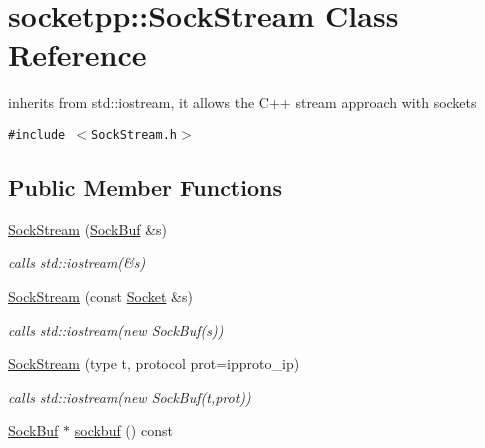 \hypertarget{classsocketpp_1_1SockStream}{
\section{socketpp::SockStream Class Reference}
\label{classsocketpp_1_1SockStream}
}
inherits from std::iostream, it allows the C++ stream approach with sockets  


{\tt \#include $<$SockStream.h$>$}

\subsection*{Public Member Functions}
\begin{CompactItemize}
\item 
\hypertarget{classsocketpp_1_1SockStream_11fbfc7bda45c178c6e09ac6d67512fd}{
\hyperlink{classsocketpp_1_1SockStream_11fbfc7bda45c178c6e09ac6d67512fd}{SockStream} (\hyperlink{classsocketpp_1_1SockBuf}{SockBuf} \&s)}
\label{classsocketpp_1_1SockStream_11fbfc7bda45c178c6e09ac6d67512fd}

\begin{CompactList}\small\item\em calls std::iostream(\&s) \item\end{CompactList}\item 
\hypertarget{classsocketpp_1_1SockStream_704f4e77af424bd0638e736653e2d1b3}{
\hyperlink{classsocketpp_1_1SockStream_704f4e77af424bd0638e736653e2d1b3}{SockStream} (const \hyperlink{classsocketpp_1_1Socket}{Socket} \&s)}
\label{classsocketpp_1_1SockStream_704f4e77af424bd0638e736653e2d1b3}

\begin{CompactList}\small\item\em calls std::iostream(new SockBuf(s)) \item\end{CompactList}\item 
\hypertarget{classsocketpp_1_1SockStream_4baa8d20dd73480832c7dd9cbad15f75}{
\hyperlink{classsocketpp_1_1SockStream_4baa8d20dd73480832c7dd9cbad15f75}{SockStream} (type t, protocol prot=ipproto\_\-ip)}
\label{classsocketpp_1_1SockStream_4baa8d20dd73480832c7dd9cbad15f75}

\begin{CompactList}\small\item\em calls std::iostream(new SockBuf(t,prot)) \item\end{CompactList}\item 
\hypertarget{classsocketpp_1_1SockStream_4b14a0ce8d640deb5f5bd64807c7b68d}{
\hyperlink{classsocketpp_1_1SockBuf}{SockBuf} $\ast$ \hyperlink{classsocketpp_1_1SockStream_4b14a0ce8d640deb5f5bd64807c7b68d}{sockbuf} () const }
\label{classsocketpp_1_1SockStream_4b14a0ce8d640deb5f5bd64807c7b68d}


\end{CompactItemize}
